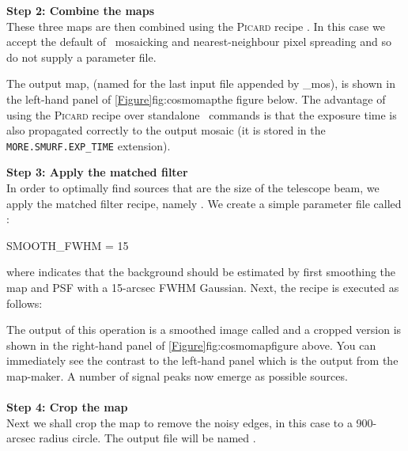 \documentclass[11pt,oneside,chapters]{starlink}
\begin{document}
\textbf{Step 2: Combine the maps}\\
These three maps are then combined using the \textsc{Picard} recipe
. In
this case we accept the default of \wcsmosaic\ mosaicking and
nearest-neighbour pixel spreading and so do not supply a parameter
file.
\begin{terminalv}
\end{terminalv}
The output map,  (named for the last input file
appended by \_mos), is shown in the left-hand panel of
\cref{Figure}{fig:cosmomap}{the figure below}. The advantage of using the
\textsc{Picard} recipe over standalone \Kappa\ commands is that the exposure
time is also propagated correctly to the output mosaic (it is stored
in the \texttt{MORE.SMURF.EXP\_TIME} extension).
\\


\textbf{Step 3: Apply the matched filter}\\
In order to optimally find sources that are the size of the telescope
beam, we apply the matched filter recipe, namely
.
We create a simple parameter file called :

\begin{terminalv}
SMOOTH_FWHM = 15
\end{terminalv}
where  indicates that the background should be
estimated by first smoothing the map and PSF with a 15-arcsec FWHM
Gaussian. Next, the recipe is executed as follows:
%
\begin{terminalv}
\end{terminalv}
%
The output of this operation is a smoothed image called
 and a cropped version is shown in the
right-hand panel of \cref{Figure}{fig:cosmomap}{figure above}. You can immediately
see the contrast to the left-hand panel which is the output from the
map-maker. A number of signal peaks now emerge as possible sources.
\\ \\
\textbf{Step 4: Crop the map}\\
Next we shall crop the map to remove the noisy edges,
in this case to a 900-arcsec radius circle. The output file will be named
.
\begin{terminalv}

\end{terminalv}
\end{document}
